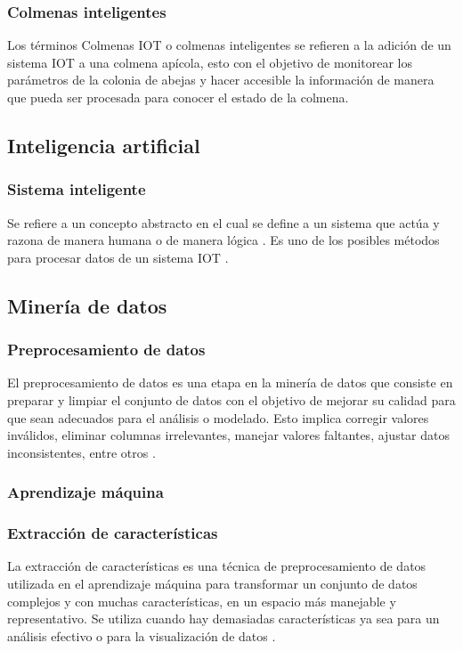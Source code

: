 \subsubsection{Colmenas inteligentes}
Los términos Colmenas IOT o colmenas inteligentes se refieren a la adición de un sistema IOT a una colmena apícola, esto con el objetivo de monitorear los parámetros de la colonia de abejas y hacer accesible la información de manera que pueda ser procesada para conocer el estado de la colmena. \cite{open_source_beehives_project_iaac}

\subsection{Inteligencia artificial}

\subsubsection{Sistema inteligente}
Se refiere a un concepto abstracto en el cual se define a un sistema que actúa y razona de manera humana o de manera lógica \cite{russell_norvig_2022}. Es uno de los posibles métodos para procesar datos de un sistema IOT \cite{open_source_beehives_project_iaac}.

\subsection{Minería de datos}

\subsubsection{Preprocesamiento de datos}
El preprocesamiento de datos es una etapa en la minería de datos que consiste en preparar y limpiar el conjunto de datos con el objetivo de mejorar su calidad para que sean adecuados para el análisis o modelado. Esto implica corregir valores inválidos, eliminar columnas irrelevantes, manejar valores faltantes, ajustar datos inconsistentes, entre otros \cite{statistical_modeling_in_machine_learning_2023}.

\subsubsection{Aprendizaje máquina}

\subsubsection{Extracción de características}
La extracción de características es una técnica de preprocesamiento de datos utilizada en el aprendizaje máquina para transformar un conjunto de datos complejos y con muchas características, en un espacio más manejable y representativo. Se utiliza cuando hay demasiadas características ya sea para un análisis efectivo o para la visualización de datos \cite{richer_coelho_2013}.
